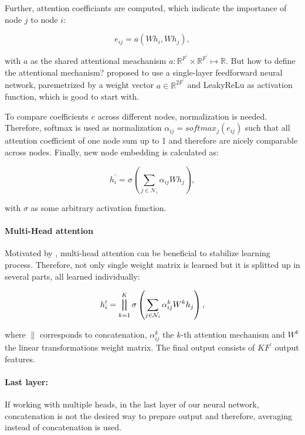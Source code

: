 Further, attention coefficiants are computed, which indicate the importance of node $j$ to node $i$:

\begin{equation}
  e_{ij} = a(Wh_i, Wh_j),
\end{equation}

with $a$ as the shared attentional meachanism $a : \mathbb{R}^{F^{\prime}} \times \mathbb{R}^{F^{\prime}} \mapsto \mathbb{R}$.
But how to define the attentional mechanism? 
\citet{GAT} proposed to use a single-layer feedforward neural network, paremetrized by a weight vector $a \in \mathbb{R}^{2F^{\prime}}$
and LeakyReLu as activation function, which is good to start with.
 
To compare coefficients $e$ across different nodes, normalization is needed.
Therefore, softmax is used as normalization $\alpha_{ij} = softmax_j(e_{ij})$ 
such that all attention coefficient of one node sum up to 1 and therefore are nicely comparable across nodes.
Finally, new node embedding is calculated as:

\begin{equation}
  h_i^{\prime} = \sigma \left( \sum_{j \in \mathcal{N}_i} \alpha_{ij} W h_j \right),
\end{equation}

with $\sigma$ as some arbitrary activation function.

\paragraph{Multi-Head attention}
Motivated by \citet{transformer}, multi-head attention can be beneficial to stabilize learning process.
Therefore, not only single weight matrix is learned but it is splitted up in several parts, 
all learned individually:

\begin{equation}
  h_i^{\prime} = \bigparallel^K_{k=1} \sigma \left(\sum_{j \in \mathcal{N}_i} \alpha_{ij}^k W^k h_j \right),  
\end{equation}

where $\parallel$ corresponds to concatenation, $\alpha_{ij}^k$ the $k$-th attention mechanism and $W^k$ the linear
transformations weight matrix. The final output consists of $KF^{\prime}$ output features.

\paragraph{Last layer:}
If working with multiple heads, in the last layer of our neural network, concatenation is not the desired 
way to prepare output and therefore, averaging instead of concatenation is used.


